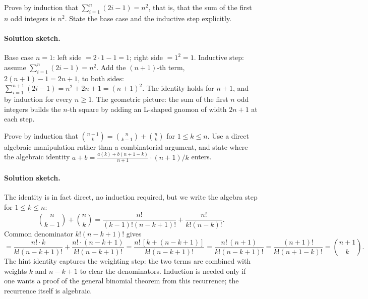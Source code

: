 \begin{exercise}
Prove by induction that $\sum_{i=1}^{n} (2i - 1) = n^{2}$, that is,
that the sum of the first $n$ odd integers is $n^{2}$. State the
base case and the inductive step explicitly.

\paragraph{Solution sketch.}
Base case $n = 1$: left side $= 2 \cdot 1 - 1 = 1$; right side $=
1^{2} = 1$.
Inductive step: assume $\sum_{i=1}^{n} (2i - 1) = n^{2}$. Add the
$(n+1)$-th term, $2(n+1) - 1 = 2n + 1$, to both sides:
$\sum_{i=1}^{n+1} (2i - 1) = n^{2} + 2n + 1 = (n+1)^{2}$.
The identity holds for $n+1$, and by induction for every $n \geq 1$.
The geometric picture: the sum of the first $n$ odd integers builds
the $n$-th square by adding an L-shaped gnomon of width $2n + 1$ at
each step.
\end{exercise}

\begin{exercise}
Prove by induction that $\binom{n+1}{k} = \binom{n}{k-1} +
\binom{n}{k}$ for $1 \leq k \leq n$. Use a direct algebraic
manipulation rather than a combinatorial argument, and state where
the algebraic identity $a + b = \frac{a(k) + b(n+1-k)}{n+1} \cdot
(n+1) / k$ enters.

\paragraph{Solution sketch.}
The identity is in fact direct, no induction required, but we
write the algebra step for $1 \leq k \leq n$:
\[
\binom{n}{k-1} + \binom{n}{k}
= \frac{n!}{(k-1)!(n-k+1)!} + \frac{n!}{k!(n-k)!}.
\]
Common denominator $k!(n-k+1)!$ gives
\[
= \frac{n! \cdot k}{k!(n-k+1)!} + \frac{n! \cdot (n-k+1)}{k!(n-k+1)!}
= \frac{n! \, [k + (n-k+1)]}{k!(n-k+1)!}
= \frac{n!\,(n+1)}{k!(n-k+1)!}
= \frac{(n+1)!}{k!(n+1-k)!}
= \binom{n+1}{k}.
\]
The hint identity captures the weighting step: the two terms are
combined with weights $k$ and $n - k + 1$ to clear the denominators.
Induction is needed only if one wants a proof of the general
binomial theorem from this recurrence; the recurrence itself is
algebraic.
\end{exercise}

